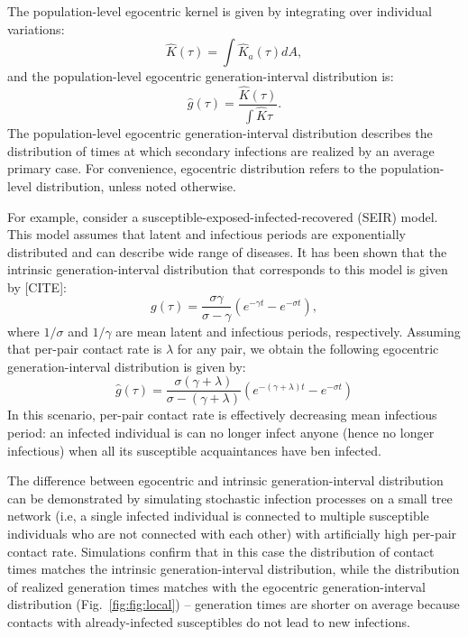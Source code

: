 \documentclass[12pt]{article}
\newcommand{\fref}[1]{Fig.~\ref{fig:#1}}
\begin{document}
The population-level egocentric kernel is given by integrating over individual variations:
\begin{equation}
\hat{K}(\tau) = \int \hat{K}_a(\tau) dA,
\end{equation}
and the population-level egocentric generation-interval distribution is:
\begin{equation}
\hat{g}(\tau) = \frac{\hat{K}(\tau)}{\int \hat{K} \tau}.
\label{eq:conditional}
\end{equation}
The population-level egocentric generation-interval distribution describes the distribution of times at which secondary infections are realized by an average primary case.
For convenience, egocentric distribution refers to the population-level distribution, unless noted otherwise.

For example, consider a susceptible-exposed-infected-recovered (SEIR) model.
This model assumes that latent and infectious periods are exponentially distributed and can describe wide range of diseases.
It has been shown that the intrinsic generation-interval distribution that corresponds to this model is given by [CITE]:
\begin{equation}
g(\tau) = \frac{\sigma \gamma}{\sigma - \gamma} \left(e^{-\gamma t} - e^{-\sigma t}\right),
\end{equation}
where $1/\sigma$ and $1/\gamma$ are mean latent and infectious periods, respectively.
Assuming that per-pair contact rate is $\lambda$ for any pair, we obtain the following egocentric generation-interval distribution is given by:
\begin{equation}
\hat{g}(\tau) = \frac{\sigma (\gamma + \lambda)}{\sigma - (\gamma + \lambda)} \left(e^{-(\gamma + \lambda)t} - e^{-\sigma t}\right)
\end{equation}
In this scenario, per-pair contact rate is effectively decreasing mean infectious period: an infected individual is can no longer infect anyone (hence no longer infectious) when all its susceptible acquaintances have ben infected.

The difference between egocentric and intrinsic generation-interval distribution can be demonstrated by simulating stochastic infection processes on a small tree network (i.e, a single infected individual is connected to multiple susceptible individuals who are not connected with each other) with artificially high per-pair contact rate.
Simulations confirm that in this case the distribution of contact times matches the intrinsic generation-interval distribution, while the distribution of realized generation times matches with the egocentric generation-interval distribution (\fref{fig:local}) -- generation times are shorter on average because contacts with already-infected susceptibles do not lead to new infections.
\end{document}
